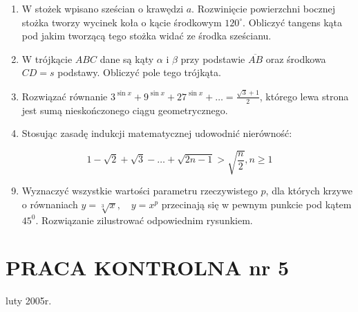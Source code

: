 \documentclass[10pt]{article}
\begin{document}
\begin{enumerate}
  \item W stożek wpisano sześcian o krawędzi $a$. Rozwinięcie powierzchni bocznej stożka tworzy wycinek koła o kącie środkowym $120^{\circ}$. Obliczyć tangens kąta pod jakim tworzącą tego stożka widać ze środka sześcianu.
  \item W trójkącie $A B C$ dane są kąty $\alpha$ i $\beta$ przy podstawie $\overline{A B}$ oraz środkowa $C D=s$ podstawy. Obliczyć pole tego trójkąta.
  \item Rozwiązać równanie $3^{\sin x}+9^{\sin x}+27^{\sin x}+\ldots=\frac{\sqrt{3}+1}{2}$, którego lewa strona jest sumą nieskończonego ciągu geometrycznego.
  \item Stosując zasadę indukcji matematycznej udowodnić nierówność:
\end{enumerate}

$$
1-\sqrt{2}+\sqrt{3}-\ldots+\sqrt{2 n-1}>\sqrt{\frac{n}{2}}, n \geqslant 1
$$

\begin{enumerate}
  \setcounter{enumi}{8}
  \item Wyznaczyć wszystkie wartości parametru rzeczywistego $p$, dla których krzywe o równaniach $y=\sqrt[3]{x}, \quad y=x^{p}$ przecinają się w pewnym punkcie pod kątem $45^{0}$. Rozwiązanie zilustrować odpowiednim rysunkiem.
\end{enumerate}

\section*{PRACA KONTROLNA nr 5}
luty 2005r.
\end{document}
